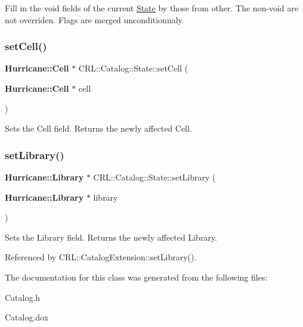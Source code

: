 Fill in the void fields of the current \hyperlink{classCRL_1_1Catalog_1_1State}{State} by those from {\ttfamily other}. The non-\/void are not overriden. Flags are merged unconditionnaly. \mbox{\label{classCRL_1_1Catalog_1_1State_a156714ad3fe2e5bb8ad8549d101526fe}} 
\subsubsection{\texorpdfstring{set\+Cell()}{setCell()}}
{\footnotesize\ttfamily \textbf{ Hurricane\+::\+Cell} $\ast$ C\+R\+L\+::\+Catalog\+::\+State\+::set\+Cell (\begin{DoxyParamCaption}\item[{\textbf{ Hurricane\+::\+Cell} $\ast$}]{cell }\end{DoxyParamCaption})}

Sets the Cell field. Returns the newly affected Cell. \mbox{\label{classCRL_1_1Catalog_1_1State_a821ac2ae33f0045232cab612ab12f84b}} 
\subsubsection{\texorpdfstring{set\+Library()}{setLibrary()}}
{\footnotesize\ttfamily \textbf{ Hurricane\+::\+Library} $\ast$ C\+R\+L\+::\+Catalog\+::\+State\+::set\+Library (\begin{DoxyParamCaption}\item[{\textbf{ Hurricane\+::\+Library} $\ast$}]{library }\end{DoxyParamCaption})\hspace{0.3cm}{\ttfamily [inline]}}

Sets the Library field. Returns the newly affected Library. 

Referenced by C\+R\+L\+::\+Catalog\+Extension\+::set\+Library().



The documentation for this class was generated from the following files\+:\begin{DoxyCompactItemize}
\item 
Catalog.\+h\item 
Catalog.\+dox\end{DoxyCompactItemize}
